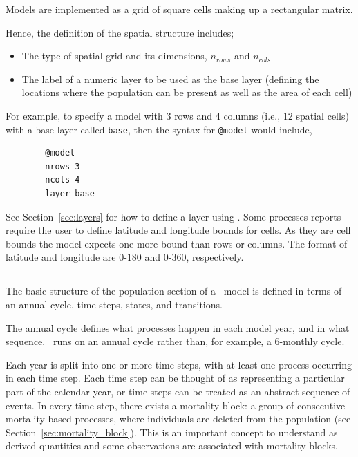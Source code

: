 Models are implemented as a grid of square cells making up a rectangular matrix.

Hence, the definition of the spatial structure includes;
\begin{itemize}
	\item The type of spatial grid and its dimensions, $n_{rows}$ and $n_{cols}$
	\item The label of a numeric layer to be used as the base layer (defining the locations where the population can be present as well as the area of each cell)
\end{itemize}

For example, to specify a model with 3 rows and 4 columns (i.e., 12 spatial cells) with a base layer called \texttt{base}, then the syntax for \texttt{@model} would include,
{\small{\begin{verbatim}
		@model
		nrows 3
		ncols 4
		layer base
		\end{verbatim}}}

See Section~\ref{sec:layers} for how to define a layer using . Some processes reports require the user to define latitude and longitude bounds for cells. As they are cell bounds the model expects one more bound than rows or columns. The format of latitude and longitude are 0-180 and 0-360, respectively.


\subsection{}\label{sub:sec:pop_sec}
The basic structure of the population section of a \IBM\ model is defined in terms of an annual cycle, time steps, states, and transitions.

The annual cycle defines what processes happen in each model year, and in what sequence. \IBM\ runs on an annual cycle rather than, for example, a 6-monthly cycle.

Each year is split into one or more time steps, with at least one process occurring in each time step. Each time step can be thought of as representing a particular part of the calendar year, or time steps can be treated as an abstract sequence of events. In every time step, there exists a mortality block: a group of consecutive mortality-based processes, where individuals are deleted from the population (see Section~\ref{sec:mortality_block}). This is an important concept to understand as derived quantities and some observations are associated with mortality blocks.

